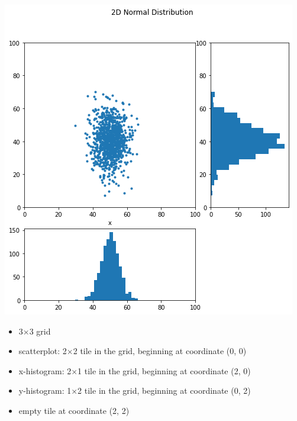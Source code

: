 \begin{frame}
%
\begin{tcolorbox}[title=2D Normal Distribution]
\begin{center}
	\begin{minipage}{.45\linewidth}
	\includegraphics[width=\linewidth]{./gfx/plt-gauss2d}	
	\end{minipage}
	\begin{minipage}{.5\linewidth}
	\begin{itemize}
	\item 3$\times$3 grid
	\item scatterplot: 2$\times$2 tile in the grid, beginning at coordinate (0, 0)
	\item x-histogram: 2$\times$1 tile in the grid, beginning at coordinate (2, 0)
	\item y-histogram: 1$\times$2 tile in the grid, beginning at coordinate (0, 2)
	\item empty tile at coordinate (2, 2)
	\end{itemize}
	\end{minipage}
\end{center}
\end{tcolorbox}
%
\end{frame}

